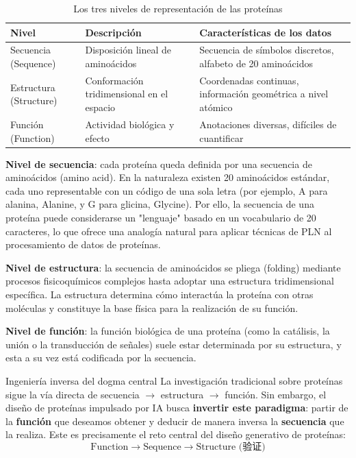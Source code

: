 \documentclass[a4paper]{article}
\begin{document}
\begin{table}[H]
\centering
\caption{Los tres niveles de representación de las proteínas}
\begin{tabular}{@{}lll@{}}
\toprule
\textbf{Nivel} & \textbf{Descripción} & \textbf{Características de los datos} \\
\midrule
Secuencia (Sequence) & Disposición lineal de aminoácidos & Secuencia de símbolos discretos, alfabeto de 20 aminoácidos \\
Estructura (Structure) & Conformación tridimensional en el espacio & Coordenadas continuas, información geométrica a nivel atómico \\
Función (Function) & Actividad biológica y efecto & Anotaciones diversas, difíciles de cuantificar \\
\bottomrule
\end{tabular}
\end{table}

\textbf{Nivel de secuencia}: cada proteína queda definida por una secuencia de aminoácidos (amino acid). En la naturaleza existen 20 aminoácidos estándar, cada uno representable con un código de una sola letra (por ejemplo, A para alanina, Alanine, y G para glicina, Glycine). Por ello, la secuencia de una proteína puede considerarse un "lenguaje" basado en un vocabulario de 20 caracteres, lo que ofrece una analogía natural para aplicar técnicas de PLN al procesamiento de datos de proteínas.

\textbf{Nivel de estructura}: la secuencia de aminoácidos se pliega (folding) mediante procesos fisicoquímicos complejos hasta adoptar una estructura tridimensional específica. La estructura determina cómo interactúa la proteína con otras moléculas y constituye la base física para la realización de su función.

\textbf{Nivel de función}: la función biológica de una proteína (como la catálisis, la unión o la transducción de señales) suele estar determinada por su estructura, y esta a su vez está codificada por la secuencia.

\begin{importantbox}{Ingeniería inversa del dogma central}
La investigación tradicional sobre proteínas sigue la vía directa de secuencia $\rightarrow$ estructura $\rightarrow$ función. Sin embargo, el diseño de proteínas impulsado por IA busca \textbf{invertir este paradigma}: partir de la \textbf{función} que deseamos obtener y deducir de manera inversa la \textbf{secuencia} que la realiza. Este es precisamente el reto central del diseño generativo de proteínas:
$$\text{Function} \rightarrow \text{Sequence} \rightarrow \text{Structure (验证)}$$
\end{importantbox}
\end{document}
